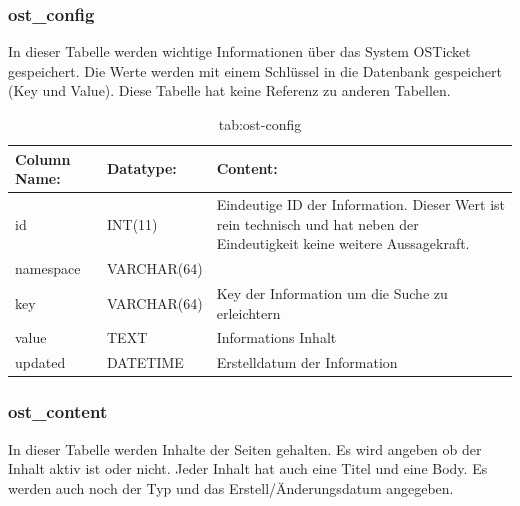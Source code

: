 \subsubsection{ost\_config}

In dieser Tabelle werden wichtige Informationen über das System OSTicket gespeichert. Die Werte werden mit einem Schlüssel in die Datenbank gespeichert (Key und Value).
Diese Tabelle hat keine Referenz zu anderen Tabellen.

\begin{table}[h]
	\begin{tabular}{|p{3.5cm}|p{4cm}|p{7.2cm}|}
		\hline
		\textbf{Column Name:} & \textbf{Datatype:} & \textbf{Content:}\\
		\hline
		id & INT(11) & Eindeutige ID der Information. Dieser Wert ist rein technisch und hat  neben der Eindeutigkeit keine weitere 
		Aussagekraft. \\
		\hline
		namespace & VARCHAR(64) & \\
		\hline
		key & VARCHAR(64) & Key der Information um die Suche zu erleichtern\\
		\hline
		value & TEXT & Informations Inhalt\\
		\hline
		updated & DATETIME & Erstelldatum der Information\\
		\hline
	\end{tabular}
	\caption{tab:ost-config}
\end{table}
\label{tab:ost_config}


\newpage
\subsubsection{ost\_content}

In dieser Tabelle werden Inhalte der Seiten gehalten. Es wird angeben ob der Inhalt aktiv ist oder nicht. Jeder Inhalt hat auch eine Titel und eine Body. Es werden auch noch der Typ und das Erstell/Änderungsdatum angegeben.

